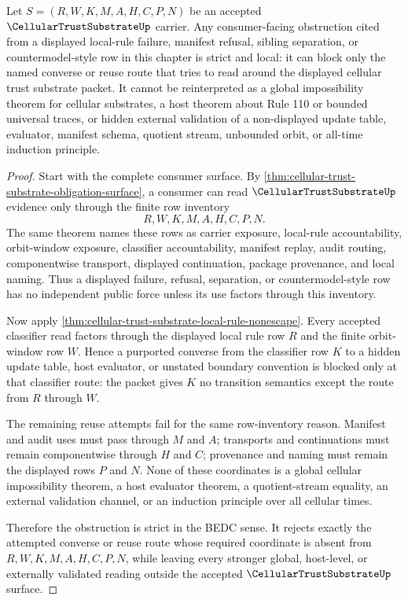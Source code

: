\begin{corollary}
\label{cor:cellular-trust-substrate-strict-obstruction-locality}
Let $S=(R,W,K,M,A,H,C,P,N)$ be an accepted $\CellularTrustSubstrateUp$ carrier. Any consumer-facing obstruction cited from a displayed local-rule failure, manifest refusal, sibling separation, or countermodel-style row in this chapter is strict and local: it can block only the named converse or reuse route that tries to read around the displayed cellular trust substrate packet. It cannot be reinterpreted as a global impossibility theorem for cellular substrates, a host theorem about Rule 110 or bounded universal traces, or hidden external validation of a non-displayed update table, evaluator, manifest schema, quotient stream, unbounded orbit, or all-time induction principle.
\end{corollary}
\begin{proof}
Start with the complete consumer surface. By \autoref{thm:cellular-trust-substrate-obligation-surface}, a consumer can read $\CellularTrustSubstrateUp$ evidence only through the finite row inventory
$$
R,W,K,M,A,H,C,P,N .
$$
The same theorem names these rows as carrier exposure, local-rule accountability, orbit-window exposure, classifier accountability, manifest replay, audit routing, componentwise transport, displayed continuation, package provenance, and local naming. Thus a displayed failure, refusal, separation, or countermodel-style row has no independent public force unless its use factors through this inventory.

Now apply \autoref{thm:cellular-trust-substrate-local-rule-nonescape}. Every accepted classifier read factors through the displayed local rule row $R$ and the finite orbit-window row $W$. Hence a purported converse from the classifier row $K$ to a hidden update table, host evaluator, or unstated boundary convention is blocked only at that classifier route: the packet gives $K$ no transition semantics except the route from $R$ through $W$.

The remaining reuse attempts fail for the same row-inventory reason. Manifest and audit uses must pass through $M$ and $A$; transports and continuations must remain componentwise through $H$ and $C$; provenance and naming must remain the displayed rows $P$ and $N$. None of these coordinates is a global cellular impossibility theorem, a host evaluator theorem, a quotient-stream equality, an external validation channel, or an induction principle over all cellular times.

Therefore the obstruction is strict in the BEDC sense. It rejects exactly the attempted converse or reuse route whose required coordinate is absent from $R,W,K,M,A,H,C,P,N$, while leaving every stronger global, host-level, or externally validated reading outside the accepted $\CellularTrustSubstrateUp$ surface.
\end{proof}

